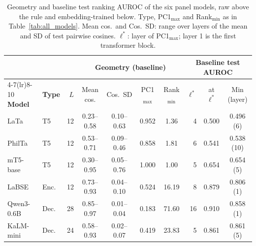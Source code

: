 \begin{table}[t]
\centering
\small
\setlength{\tabcolsep}{5pt}
\begin{tabular}{llrccccrcc}
\toprule
& & & \multicolumn{4}{c}{\textbf{Geometry (baseline)}} & \multicolumn{3}{c}{\textbf{Baseline test AUROC}} \\
\cmidrule(lr){4-7}\cmidrule(lr){8-10}
\textbf{Model} & \textbf{Type} & $L$ & Mean cos. & Cos.\ SD & PC1$_{\max}$ & Rank$_{\min}$ & $\ell^{*}$ & at $\ell^{*}$ & Min (layer) \\
\midrule
LaTa & T5 & 12 & 0.23--0.58 & 0.10--0.63 & 0.952 & 1.36 & 4 & 0.500 & 0.496 (6) \\
PhilTa & T5 & 12 & 0.53--0.71 & 0.09--0.46 & 0.858 & 1.81 & 6 & 0.541 & 0.538 (10) \\
mT5-base & T5 & 12 & 0.30--0.95 & 0.05--0.76 & 1.000 & 1.00 & 5 & 0.654 & 0.654 (5) \\
\midrule
LaBSE & Enc. & 12 & 0.73--0.93 & 0.04--0.10 & 0.524 & 16.19 & 8 & 0.879 & 0.806 (1) \\
Qwen3-0.6B & Dec. & 28 & 0.85--0.97 & 0.01--0.04 & 0.183 & 71.60 & 16 & 0.910 & 0.858 (1) \\
KaLM-mini & Dec. & 24 & 0.58--0.93 & 0.02--0.07 & 0.419 & 23.83 & 5 & 0.861 & 0.861 (5) \\
\bottomrule
\end{tabular}
\caption{Geometry and baseline test ranking AUROC of the six panel models, raw above the rule and embedding-trained below. Type, PC1$_{\max}$ and Rank$_{\min}$ as in Table~\ref{tab:all_models}. Mean cos.\ and Cos.\ SD: range over layers of the mean and SD of test pairwise cosines. $\ell^{*}$: layer of PC1$_{\max}$; layer 1 is the first transformer block.}
\label{tab:geometry_regimes}
\end{table}
